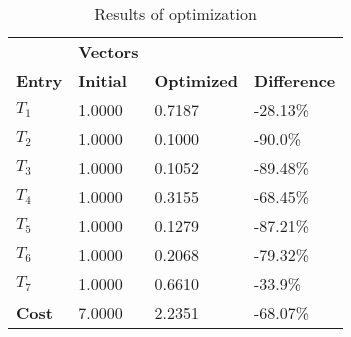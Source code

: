 \begin{table}[H]
\centering
\begin{tabular}{llll}
\textbf{}      & \cellcolor[HTML]{EFEFEF}\textbf{Vectors} & \textbf{} & \textbf{}         \\
\rowcolor[HTML]{EFEFEF} 
\textbf{Entry} & \textbf{Initial} & \textbf{Optimized} & \textbf{Difference} \\
$T_1$ & 1.0000 & 0.7187 & -28.13\% \\ 
$T_2$ & 1.0000 & 0.1000 & -90.0\% \\ 
$T_3$ & 1.0000 & 0.1052 & -89.48\% \\ 
$T_4$ & 1.0000 & 0.3155 & -68.45\% \\ 
$T_5$ & 1.0000 & 0.1279 & -87.21\% \\ 
$T_6$ & 1.0000 & 0.2068 & -79.32\% \\ 
$T_7$ & 1.0000 & 0.6610 & -33.9\% \\ 
\rowcolor[HTML]{EFEFEF} 
\textbf{Cost}  & 7.0000 & 2.2351 & -68.07\% \\ 
\end{tabular}
\caption{Results of optimization}
\label{tab:OptimizationAnalysis}
\end{table}